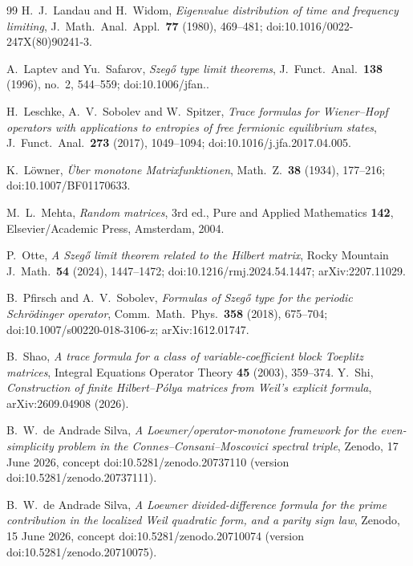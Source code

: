 \begin{thebibliography}{99}
 H.~J.~Landau and H.~Widom, \emph{Eigenvalue
distribution of time and frequency limiting}, J.\ Math.\ Anal.\ Appl.\ \textbf{77}
(1980), 469--481; doi:10.1016/0022-247X(80)90241-3.

 A.~Laptev and Yu.~Safarov,
\emph{Szeg\H{o} type limit theorems}, J.\ Funct.\ Anal.\ \textbf{138}
(1996), no.~2, 544--559; doi:10.1006/\allowbreak jfan..

 H.~Leschke, A.~V.~Sobolev and W.~Spitzer,
\emph{Trace formulas for Wiener--Hopf operators with applications to entropies
of free fermionic equilibrium states}, J.\ Funct.\ Anal.\ \textbf{273} (2017),
1049--1094; doi:10.1016/j.jfa.2017.04.005.

 K.~L\"owner, \emph{\"Uber monotone Matrixfunktionen},
Math.\ Z.\ \textbf{38} (1934), 177--216; doi:10.1007/BF01170633.

 M.~L.~Mehta, \emph{Random matrices}, 3rd ed., Pure and
Applied Mathematics \textbf{142}, Elsevier/Academic Press, Amsterdam, 2004.

 P.~Otte, \emph{A Szeg\H{o} limit theorem related to the
Hilbert matrix}, Rocky Mountain J.\ Math.\ \textbf{54} (2024), 1447--1472;
doi:10.1216/rmj.2024.54.1447; arXiv:2207.11029.

 B.~Pfirsch and A.~V.~Sobolev, \emph{Formulas of
Szeg\H{o} type for the periodic Schr\"odinger operator}, Comm.\ Math.\ Phys.\
\textbf{358} (2018), 675--704; doi:10.1007/s00220-018-3106-z; arXiv:1612.01747.

 B.~Shao,
\emph{A trace formula for a class of variable-coefficient block Toeplitz matrices},
Integral Equations Operator Theory \textbf{45} (2003), 359--374.
\bibitem{Shi2026} Y.~Shi, \emph{Construction of finite Hilbert--P\'olya
matrices from Weil's explicit formula}, arXiv:2609.04908 (2026).

 B.~W.~de Andrade Silva, \emph{A Loewner/operator-monotone
framework for the even-simplicity problem in the Connes--Consani--Moscovici
spectral triple}, Zenodo, 17 June 2026, concept
doi:10.5281/zenodo.20737110 (version doi:10.5281/zenodo.20737111).

 B.~W.~de Andrade Silva, \emph{A Loewner
divided-difference formula for the prime contribution in the localized Weil
quadratic form, and a parity sign law}, Zenodo, 15 June 2026, concept
doi:10.5281/zenodo.20710074 (version doi:10.5281/zenodo.20710075).


\end{thebibliography}
